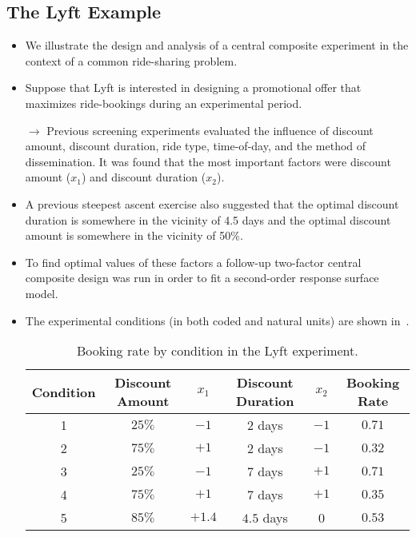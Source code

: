 \subsection{The Lyft Example}
\begin{itemize}
    \item We illustrate the design and analysis of a central composite experiment in the context of a common
          ride-sharing problem.
    \item Suppose that Lyft is interested in designing a promotional offer that maximizes ride-bookings during
          an experimental period.
    \item[$\rightarrow$] Previous screening experiments evaluated the influence of discount amount, discount duration, ride
        type, time-of-day, and the method of dissemination. It was found that the most important factors
        were discount amount ($ x_1 $) and discount duration ($ x_2 $).
    \item A previous steepest ascent exercise also suggested that the optimal discount duration is somewhere in
          the vicinity of 4.5 days and the optimal discount amount is somewhere in the vicinity of 50\%.
    \item To find optimal values of these factors a follow-up two-factor central composite design was run in order
          to fit a second-order response surface model.
    \item The experimental conditions (in both coded and natural units) are shown in~.
          \begin{table}[!htbp]
              \centering
              \caption{Booking rate by condition in the Lyft experiment.}\label{tab:Lyft}
              \begin{tabular}{cccccc}
                  \toprule Condition & Discount Amount & $x_{1}$ & Discount Duration & $x_{2}$ & Booking Rate \\
                  \midrule 1         & $25 \%$         & $-1$    & 2 days            & $-1$    & $0.71$       \\
                  2                  & $75 \%$         & $+1$    & 2 days            & $-1$    & $0.32$       \\
                  3                  & $25 \%$         & $-1$    & 7 days            & $+1$    & $0.71$       \\
                  4                  & $75 \%$         & $+1$    & 7 days            & $+1$    & $0.35$       \\
                  5                  & $85 \%$         & $+1.4$  & $4.5$ days        & 0       & $0.53$       \\

\end{tabular}
\end{table}
\end{itemize}

